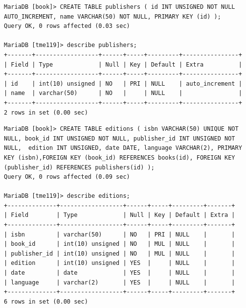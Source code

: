 \documentclass{assignment}
\begin{document}
\begin{verbatim}
MariaDB [book]> CREATE TABLE publishers ( id INT UNSIGNED NOT NULL AUTO_INCREMENT, name VARCHAR(50) NOT NULL, PRIMARY KEY (id) );
Query OK, 0 rows affected (0.03 sec)

MariaDB [tme119]> describe publishers;
+-------+------------------+------+-----+---------+----------------+
| Field | Type             | Null | Key | Default | Extra          |
+-------+------------------+------+-----+---------+----------------+
| id    | int(10) unsigned | NO   | PRI | NULL    | auto_increment |
| name  | varchar(50)      | NO   |     | NULL    |                |
+-------+------------------+------+-----+---------+----------------+
2 rows in set (0.00 sec)
\end{verbatim}

\begin{verbatim}
MariaDB [book]> CREATE TABLE editions ( isbn VARCHAR(50) UNIQUE NOT NULL, book_id INT UNSIGNED NOT NULL, publisher_id INT UNSIGNED NOT NULL,  edition INT UNSIGNED, date DATE, language VARCHAR(2), PRIMARY KEY (isbn),FOREIGN KEY (book_id) REFERENCES books(id), FOREIGN KEY (publisher_id) REFERENCES publishers(id) );
Query OK, 0 rows affected (0.09 sec)

MariaDB [tme119]> describe editions;
+--------------+------------------+------+-----+---------+-------+
| Field        | Type             | Null | Key | Default | Extra |
+--------------+------------------+------+-----+---------+-------+
| isbn         | varchar(50)      | NO   | PRI | NULL    |       |
| book_id      | int(10) unsigned | NO   | MUL | NULL    |       |
| publisher_id | int(10) unsigned | NO   | MUL | NULL    |       |
| edition      | int(10) unsigned | YES  |     | NULL    |       |
| date         | date             | YES  |     | NULL    |       |
| language     | varchar(2)       | YES  |     | NULL    |       |
+--------------+------------------+------+-----+---------+-------+
6 rows in set (0.00 sec)
\end{verbatim}
\end{document}
